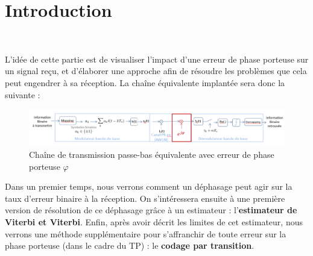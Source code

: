 \documentclass[11pt,a4paper]{report}
\begin{document}
\pagestyle{fancy}
\renewcommand\headrulewidth{1pt}
\fancyhead[L]{\nouppercase{\leftmark}}
\renewcommand\footrulewidth{1pt}
\renewcommand\thesection{\arabic{section}}


\tableofcontents



\renewcommand\thesection{\arabic{section}}

\part{Introduction}

$~$

\vspace{6.5cm}


L'idée de cette partie est de visualiser l'impact d'une erreur de phase porteuse sur un signal reçu, et d'élaborer une approche afin de résoudre les problèmes que cela peut engendrer à sa réception. La chaîne équivalente implantée sera donc la suivante :
\begin{figure}[H]
    \centering
    \includegraphics[width=15 cm]{Screenshots/schema.png}
    \caption{Chaîne de transmission passe-bas équivalente avec erreur de phase porteuse $\varphi$}
    \label{fig:un_label} 
\end{figure}

\vspace{0.3cm}

Dans un premier temps, nous verrons comment un déphasage peut agir sur la taux d'erreur binaire à la réception. On s'intéressera ensuite à une première version de résolution de ce déphasage grâce à un estimateur : l'\textbf{estimateur de Viterbi et Viterbi}. Enfin, après avoir décrit les limites de cet estimateur, nous verrons une méthode supplémentaire pour s'affranchir de toute erreur sur la phase porteuse (dans le cadre du TP) : le \textbf{codage par transition}.
\end{document}
